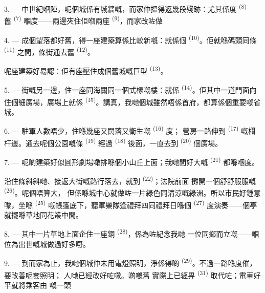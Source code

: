 3. --- 中世紀嗰陣，呢個城係有城牆嘅，而家仲搵得返幾段殘跡：尤其係度
 \textsuperscript{(8)}——舊 \textsuperscript{(7)} 嗰度——兩邊夾住佢嗰兩座
 \textsuperscript{(9)}，而家改咗做

4. --- 成個望落都好舊，得一座建築算係比較新嘅：就係個
\textsuperscript{(10)}。佢就喺碼頭同條 \textsuperscript{(11)} 之間，條街通去舊
 \textsuperscript{(12)}。

呢座建築好易認：佢有座壓住成個舊城嘅巨型 \textsuperscript{(13)}。

5. --- 街嘅另一邊，住一座同海關同一個式樣嘅樓：就係
\textsuperscript{(14)}。佢其中一道門面向住個細廣場，廣場上就係
\textsuperscript{(15)}。講真，我哋個城雖然唔係首府，都算係個重要嘅省城。

\VUsaut{5.0mm}
\VUsaut{3.4mm}

6. --- 駐軍人數唔少，住喺幾座又闊落又衛生嘅 \textsuperscript{(16)} 度；
營房一路伸到 \textsuperscript{(17)} 嘅欄杆邊。通去呢個公園嘅條
 \textsuperscript{(19)} 經過 \textsuperscript{(18)} 後面，一直去到
 \textsuperscript{(20)} 個廣場。

7. --- 呢啲建築好似圓形劇場噉排喺個小山丘上面；我哋間好大嘅
\textsuperscript{(21)} 都喺嗰度。

沿住條斜斜哋、接返大街嘅路行落去，就到 \textsuperscript{(22)}；法院前面
攤開一個舒舒服服嘅 \textsuperscript{(26)}。呢個唔算大，
但係喺城中心就做咗一片綠色同清涼嘅綠洲。所以市民好鍾意嚟，坐喺
\textsuperscript{(25)} 嘅帳篷底下，聽軍樂隊逢禮拜四同禮拜日喺個
\textsuperscript{(27)} 度演奏——個亭就擺喺草地同花叢中間。

8. --- 其中一片草地上面企住一座銅 \textsuperscript{(28)}，係為咗紀念我哋
一位同鄉而立嘅——嗰位為出世嘅城做過好多嘢。

\VUsaut{4.0mm}
\VUsaut{3.4mm}

9. --- 到而家為止，我哋個城仲未用電燈照明，淨係得啲
\textsuperscript{(29)}。不過一路喺度催，要改善呢套照明；
人哋已經改好咗噉。啲嘅舊
實際上已經畀 \textsuperscript{(31)} 取代咗；電車好平就將乘客由
嘅一頭

